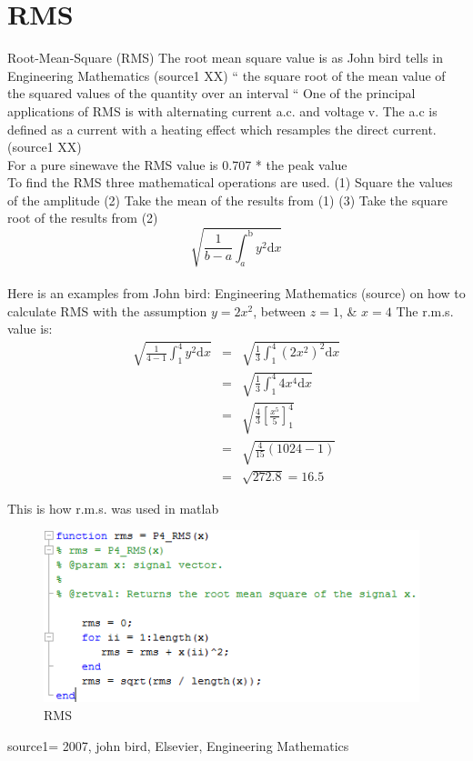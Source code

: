 \section{RMS}

Root-Mean-Square (RMS)
The root mean square value is as John bird tells in Engineering Mathematics (source1 XX) “ the square root of the mean value of the squared values of the quantity over an interval “
One of the principal applications of RMS is with alternating current a.c. and voltage v. The a.c is defined as a current with a heating effect which resamples the direct current. (source1 XX)
\\
For a pure sinewave the RMS value is 0.707 * the peak value
\\
To find the RMS three mathematical operations are used.
(1)	Square the values of the amplitude
(2)	Take the mean of the results from (1)
(3)	Take the square root of the results from (2)
\begin{equation}\label{eq:RMS formular}
\sqrt{\frac{1}{b-a} \int_a^\mathrm{b}y^2\mathrm{d}x}
\end{equation}
\\
Here is an examples from John bird: Engineering Mathematics (source) on how to calculate RMS with the assumption $y = 2x^2$, between $z = 1$, \& $x = 4$
The r.m.s. value is:
\\
\begin{equation}\label{eq:RMS formular}
\begin{array}{rcl}
  \sqrt{\frac{1}{4-1} \int_1^\mathrm{4}y^2\mathrm{d}x}
  & = & \sqrt{\frac{1}{3} \int_1^\mathrm{4}(2x^2)^2\mathrm{d}x}\\
  & = & \sqrt{\frac{1}{3} \int_1^\mathrm{4}4x^4\mathrm{d}x}\\
  & = & \sqrt{\frac{4}{3} [\frac{x^5}{5}]_1^4}\\
  & = & \sqrt{\frac{4}{15} (1024-1)}\\
  & = & \sqrt{272.8} = 16.5
\end{array}
\end{equation}

This is how r.m.s. was used in matlab
\begin{figure}
\begin{center}
\includegraphics[height=5cm]{fig/RMS_matlabCode.png}
\caption{RMS}
\end{center}
\end{figure}

source1= 2007, john bird, Elsevier, Engineering Mathematics